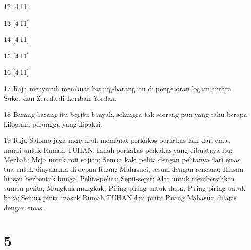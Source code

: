 \par 12 [4:11]
\par 13 [4:11]
\par 14 [4:11]
\par 15 [4:11]
\par 16 [4:11]
\par 17 Raja menyuruh membuat barang-barang itu di pengecoran logam antara Sukot dan Zereda di Lembah Yordan.
\par 18 Barang-barang itu begitu banyak, sehingga tak seorang pun yang tahu berapa kilogram perunggu yang dipakai.
\par 19 Raja Salomo juga menyuruh membuat perkakas-perkakas lain dari emas murni untuk Rumah TUHAN. Inilah perkakas-perkakas yang dibuatnya itu: Mezbah; Meja untuk roti sajian; Semua kaki pelita dengan pelitanya dari emas tua untuk dinyalakan di depan Ruang Mahasuci, sesuai dengan rencana; Hiasan-hiasan berbentuk bunga; Pelita-pelita; Sepit-sepit; Alat untuk membersihkan sumbu pelita; Mangkuk-mangkuk; Piring-piring untuk dupa; Piring-piring untuk bara; Semua pintu masuk Rumah TUHAN dan pintu Ruang Mahasuci dilapis dengan emas.

\chapter{5}

